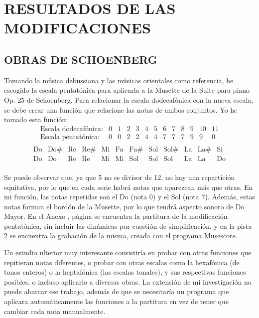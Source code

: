 	\chapter{RESULTADOS DE LAS MODIFICACIONES}
    
    
    \section{OBRAS DE SCHOENBERG}
   
   	Tomando la música debussiana y las músicas orientales como referencia, he escogido la escala pentatónica para aplicarla a la Musette de la Suite para piano Op. 25 de Schoenberg. Para relacionar la escala dodecafónica con la nueva escala, se debe crear una función que relacione las notas de ambos conjuntos. Yo he tomado esta función:
   	$$\left.\begin{matrix}\text{Escala dodecafónica:}&0&1&2&3&4&5&6&7&8&9&10&11\\\text{Escala pentatónica:}&0&0&2&2&4&4&7&7&7&9&9&0\\\end{matrix}\right.$$
   	$$\left.\begin{matrix}\text{Do}&\text{Do\#}&\text{Re}&\text{Re\#}&\text{Mi}&\text{Fa}&\text{Fa\#}&\text{Sol}&\text{Sol\#}&\text{La}&\text{La\#}&\text{Si}\\\text{Do}&\text{Do}&\text{Re}&\text{Re}&\text{Mi}&\text{Mi}&\text{Sol}&\text{Sol}&\text{Sol}&\text{La}&\text{La}&\text{Do}\\\end{matrix}\right.$$
   	
   	Se puede observar que, ya que 5 no es divisor de 12, no hay una repartición equitativa, por lo que en cada serie habrá notas que aparezcan más que otras. En mi función, las notas repetidas son el Do (nota 0) y el Sol (nota 7). Además, estas notas forman el bordón de la Musette, por lo que tendrá aspecto sonoro de Do Mayor. En el Anexo , página  se encuentra la partitura de la modificación pentatónica, sin incluir las dinámicas por cuestión de simplificación, y en la pista 2 se encuentra la grabación de la misma, creada con el programa Musescore.
   	
   	Un estudio ulterior muy interesante consistiría en probar con otras funciones que repitieran notas diferentes, o probar con otras escalas como la hexafónica (de tonos enteros) o la heptafónica (las escalas tonales), y sus respectivas funciones posibles, o incluso aplicarlo a diversas obras. La extensión de mi investigación no puede abarcar ese trabajo, además de que se necesitaría un programa que aplicara automáticamente las funciones a la partitura en vez de tener que cambiar cada nota manualmente.
   	
